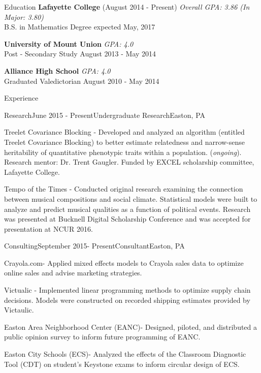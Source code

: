 \documentclass{resume} %
\begin{document}
\begin{rSection}{Education}
{\bf Lafayette College} (August 2014 - Present) \hfill {\em Overall GPA: 3.86 (In Major: 3.80)} \\ 
B.S. in Mathematics \hfill Degree expected May, 2017

{\bf University of Mount Union} \hfill {\em GPA: 4.0} \\ 
Post - Secondary Study \hfill August 2013 - May 2014


{\bf Alliance High School} \hfill {\em GPA: 4.0} \\ 
Graduated Valedictorian \hfill August 2010 - May 2014
\end{rSection}

\begin{rSection}{Experience}

\begin{rSubsection}{Research}{June 2015 - Present}{Undergraduate Research}{Easton, PA}
\item Treelet Covariance Blocking - Developed and analyzed an algorithm (entitled Treelet Covariance Blocking) to better estimate relatedness and narrow-sense heritability of quantitative phenotypic traits within a population. (\textit{ongoing}). Research mentor: Dr. Trent Gaugler. Funded by EXCEL scholarship committee, Lafayette College. 
\item Tempo of the Times -   Conducted original research examining the connection between musical compositions and social climate. Statistical models were built to analyze and predict musical qualities as a function of political events. Research was presented at Bucknell Digital Scholarship Conference and was accepted for presentation at NCUR 2016. 

\end{rSubsection}


\begin{rSubsection}{Consulting}{September 2015- Present}{Consultant}{Easton, PA} 
\item Crayola.com- Applied mixed effects models to Crayola sales data to optimize online sales and advise marketing strategies.
\item Victualic - Implemented linear programming methods to optimize supply chain decisions. Models were constructed on recorded shipping estimates provided by Victaulic. 
\item Easton Area Neighborhood Center (EANC)- Designed, piloted, and distributed a public opinion survey to inform future programming of EANC. 
\item Easton City Schools (ECS)- Analyzed the effects of the Classroom Diagnostic Tool (CDT) on student's Keystone exams to inform circular design of ECS. 
\end{rSubsection}


\end{rSection}
\end{document}
